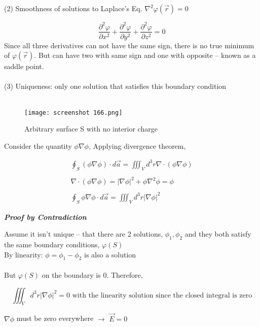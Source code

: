 \documentclass[svgnames]{article}   	%
\begin{document}
(2) Smoothness of solutions to Laplace's Eq. $\nabla^2 \varphi(\vec{r}) = 0 $

\[
\frac{\partial^2 \varphi}{\partial x^2}  + \frac{\partial^2 \varphi}{\partial
y^2} + \frac{\partial^2 \varphi}{\partial z^2}  = 0 
\] \vspace{5px}
Since all three derivatives can not have the same sign, there is no true
minimum of $\varphi(\vec{r}) $. But can have two with same sign and one with
opposite -- known as a saddle point. \mbox{} \\\\


(3) Uniqueness: only one solution that satisfies this boundary condition
\mbox{}\\\\
\begin{figure}[H]
  \centering
    \texttt{[image: screenshot 166.png]}
    \caption{Arbitrary surface S with no interior charge}
\end{figure}



Consider the quantity $\phi \nabla \phi$, Applying divergence theorem, 

\begin{align*}
  \oint_S (\phi \nabla \phi) \cdot d\vec{a} = \iiint_V d^3r \nabla \cdot (\phi
  \nabla \phi) \\\\
  \nabla \cdot (\phi \nabla \phi) = |\nabla \phi|^2 + \phi \nabla^2 \phi = \phi
  \\\\
  \oint_S \phi \nabla \phi \cdot d\vec{a} = \iiint_V d^3r |\nabla \phi|^2
\end{align*}

\textit{ \textbf{Proof by Contradiction}} 

Assume it isn't unique -- that there are 2 solutions, $\phi_1, \phi_2$ and they
both satisfy the same boundary conditions, $\varphi(S)$ \mbox{}\\

By linearity: $\phi = \phi_1 - \phi_2$ is also a solution \mbox{}\\\\

But $\varphi(S)$ on the boundary is $0$. Therefore, 

\[
\iiint_V d^3r |\nabla \phi|^2 = 0 \text{ with the linearity solution since the
closed integral is zero}
\]

$\nabla \phi$ must be zero everywhere $\rightarrow$ $\vec{E} = 0$ \mbox{}\\\\
\end{document}
